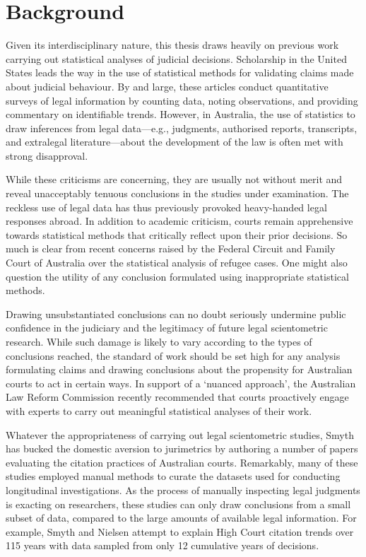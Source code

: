\let\xn\xnote
\section{Background}


Given its interdisciplinary nature, this thesis draws heavily on previous work carrying out statistical analyses of judicial decisions. Scholarship in the United States leads the way in the use of statistical methods for validating claims made about judicial behaviour.\xn{2-1} By and large, these articles conduct quantitative surveys of legal information by counting data, noting observations, and providing commentary on identifiable trends.\xn{2-2} However, in Australia, the use of statistics to draw inferences from legal data---e.g., judgments, authorised reports, transcripts, and extralegal literature---about the development of the law is often met with strong disapproval.\xn{2-3} 

While these criticisms are concerning, they are usually not without merit and reveal unacceptably tenuous conclusions in the studies under examination.\xn{2-3a} The reckless use of legal data has thus previously provoked heavy-handed legal responses abroad.\xn{2-3b} In addition to academic criticism, courts remain apprehensive towards statistical methods that critically reflect upon their prior decisions.\xn{2-3ba} So much is clear from recent concerns raised by the Federal Circuit and Family Court of Australia over the statistical analysis of refugee cases.\xn{2-3bb} One might also question the utility of any conclusion formulated using inappropriate statistical methods.

Drawing unsubstantiated conclusions can no doubt seriously undermine public confidence in the judiciary and the legitimacy of future legal scientometric research.\xn{2-3bc} While such damage is likely to vary according to the types of conclusions reached, the standard of work should be set high for any analysis formulating claims and drawing conclusions about the propensity for Australian courts to act in certain ways. In support of a `nuanced approach', the Australian Law Reform Commission recently recommended that courts proactively engage with experts to carry out meaningful statistical analyses of their work.\xn{2-3c}

Whatever the appropriateness of carrying out legal scientometric studies, Smyth has  bucked the domestic aversion to jurimetrics by authoring a number of papers evaluating the citation practices of Australian courts.\xn{2-4} Remarkably, many of these studies employed manual methods to curate the datasets used for conducting longitudinal investigations.\xn{2-5} As the process of manually inspecting legal judgments is exacting on researchers, these studies can only draw conclusions from a small subset of data, compared to the large amounts of available legal information. For example, Smyth and Nielsen attempt to explain High Court citation trends over 115 years with data sampled from only 12 cumulative years of decisions.\xn{2-5a}

